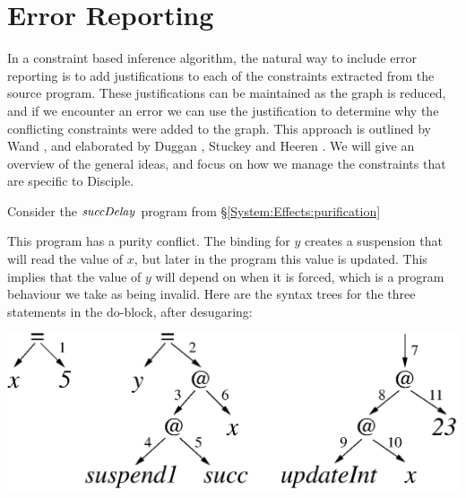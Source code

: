 
\section{Error Reporting}
\label{inference:errors}
In a constraint based inference algorithm, the natural way to include error reporting is to add justifications to each of the constraints extracted from the source program. These justifications can be maintained as the graph is reduced, and if we encounter an error we can use the justification to determine why the conflicting constraints were added to the graph. This approach is outlined by Wand \cite{wand:finding-type-errors}, and elaborated by Duggan \cite{duggan:explaining-type-inference}, Stuckey \cite{stuckey:improving-type-error-diagnosis} and Heeren \cite{heeren:top-quality-error-messages}. We will give an overview of the general ideas, and focus on how we manage the constraints that are specific to Disciple.

Consider the $\operatorname{\mathit{succDelay}}$ program from \S\ref{System:Effects:purification}


This program has a purity conflict. The binding for $y$ creates a suspension that will read the value of $x$, but later in the program this value is updated. This implies that the value of $y$ will depend on when it is forced, which is a program behaviour we take as being invalid. Here are the syntax trees for the three statements in the do-block, after desugaring:

\begin{center}
\includegraphics[scale=0.5]{3-Inference/fig/errors/suspend-succ.eps}
\end{center}

